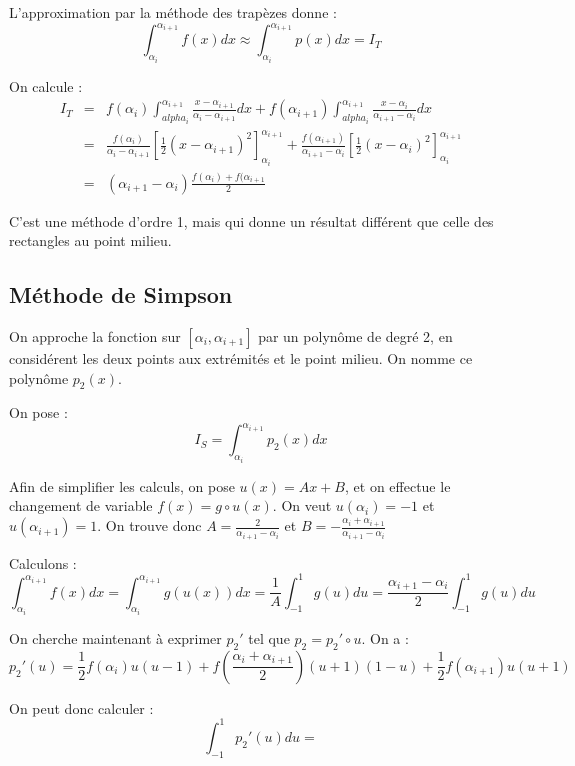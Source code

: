 \documentclass{article}
\begin{document}
L'approximation par la méthode des trapèzes donne : \begin{equation}
    \int_{\alpha_i}^{\alpha_{i+1}} f(x)dx \approx \int_{\alpha_i}^{\alpha_{i+1}} p(x)dx = I_T
\end{equation}

On calcule : \[ \begin{array}{rcl}
        I_T & = & f(\alpha_i)\int_{alpha_i}^{\alpha_{i+1}}\frac{x - \alpha_{i+1}}{\alpha_i-\alpha_{i+1}}dx + f(\alpha_{i+1})\int_{alpha_i}^{\alpha_{i+1}}\frac{x - \alpha_i}{\alpha_{i+1} - \alpha_i}dx \\
            & = & \frac{f(\alpha_i)}{\alpha_i - \alpha_{i+1}}\left[\frac{1}{2}(x - \alpha_{i+1})^2\right]_{\alpha_i}^{\alpha_{i+1}} + \frac{f(\alpha_{i+1})}{\alpha_{i+1} - \alpha_i}\left[\frac{1}{2}(x-\alpha_i)^2\right]_{\alpha_i}^{\alpha_{i+1}} \\
            & = & (\alpha_{i+1} - \alpha_i)\frac{f(\alpha_i) + f(\alpha_{i+1}}{2}
    \end{array}
\]

C'est une méthode d'ordre 1, mais qui donne un résultat différent que celle des rectangles au point milieu.

\subsection{Méthode de Simpson}
On approche la fonction sur $[\alpha_i, \alpha_{i+1}]$ par un polynôme de degré 2, en considérent les deux points aux extrémités et le point milieu. On nomme ce polynôme $p_2(x)$.

On pose : \[ I_S = \int_{\alpha_i}^{\alpha_{i+1}} p_2(x)dx \]

Afin de simplifier les calculs, on pose $u(x) = Ax+B$, et on effectue le changement de variable $f(x) = g \circ u(x)$. On veut $u(\alpha_i) = -1$ et $u(\alpha_{i+1}) = 1$. On trouve donc $A = \frac{2}{\alpha_{i+1} - \alpha_i}$ et $B = -\frac{\alpha_i + \alpha_{i+1}}{\alpha_{i+1} - \alpha_i}$

Calculons : \[ \int_{\alpha_i}^{\alpha_{i+1}} f(x)dx = \int_{\alpha_i}^{\alpha_{i+1}} g(u(x))dx = \frac{1}{A}\int_{-1}^1 g(u)du = \frac{\alpha_{i+1} - \alpha_{i}}{2} \int_{-1}^{1} g(u)du \]

On cherche maintenant à exprimer $p_2'$ tel que $p_2 = p_2' \circ u$. On a :
\[ p_2'(u) = \frac{1}{2}f(\alpha_i)u(u-1) + f\left(\frac{\alpha_i + \alpha_{i+1}}{2}\right)(u+1)(1-u) + \frac{1}{2}f(\alpha_{i+1})u(u+1) \]

On peut donc calculer :
\[ \int_{-1}^1 p_2'(u)du = \]
\end{document}
